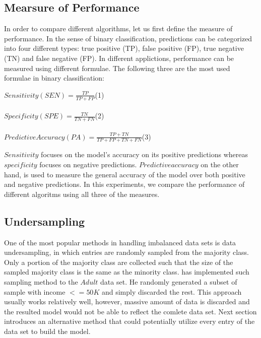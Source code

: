 \documentclass{article}
\begin{document}
\subsection{Mearsure of Performance}
\label{measure_of_performance}

In order to compare different algorithms, let us first define the measure of performance. In the sense of binary classification, predictions can be categorized into four different types: true positive (TP), false positive (FP), true negative (TN) and false negative (FP). In different applictions, performance can be measured using different formulae. The following three are the most used formulae \citep{binary} in binary classification:\\
\begin{center}
\hfill$Sensitivity (SEN)=\frac{TP}{TP+FP}$\hfill (1)\\\hfill\\
\hfill$Specificity (SPE)=\frac{TN}{TN+FN}$\hfill (2)\\\hfill\\
\hfill$Predictive Accuracy (PA)=\frac{TP+TN}{TP+FP+TN+FN}$\hfill (3)\\
\end{center}
$Sensitivity$ focuses on the model's accuracy on its positive predictions whereas $specificity$ focuses on negative predictions. $Predictive accuracy$ on the other hand, is used to measure the general accuracy of the model over both positive and negative predictions. In this experiments, we compare the performance of different algoritms using all three of the measures.

\subsection{Undersampling}
\label{undersampling}

One of the most popular methods in handling imbalanced data sets is data undersampling, in which entries are randomly sampled from the majority class. Only a portion of the majority class are collected such that the size of the sampled majority class is the same as the minority class. \citet{Inouye} has implemented such sampling method to the $Adult$ data set. He randomly generated a subset of sample with income $<=50K$ and simply discarded the rest. This approach usually works relatively well, however, massive amount of data is discarded and the resulted model would not be able to reflect the comlete data set. Next section introduces an alternative method that could potentially utilize every entry of the data set to build the model.
\end{document}
